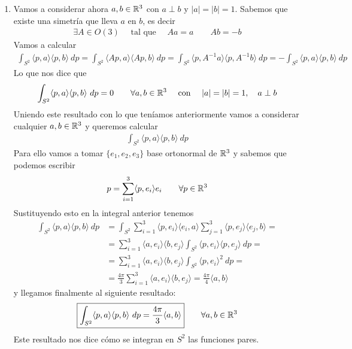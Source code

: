 \begin{ejemplo}
\begin{enumerate}
        \item Vamos a considerar ahora $a,b\in \mathbb{R}^3$ con $a\perp b$ y $|a|=|b|=1$. Sabemos que existe una simetría que lleva $a$ en $b$, es decir
        \begin{gather*}
            \exists A \in O(3) \quad \text{ tal que } \quad Aa=a \qquad Ab=-b
        \end{gather*}
        Vamos a calcular
        \begin{gather*}
            \int_{S^2} \langle p,a \rangle \langle p,b\rangle\ dp = 
            \int_{S^2} \langle Ap, a \rangle \langle Ap, b \rangle\ dp =
            \int_{S^2} \langle p, A^{-1}a \rangle \langle p,A^{-1}b \rangle\ dp = 
            -\int_{S^2} \langle p, a \rangle \langle p, b \rangle\ dp
        \end{gather*}
        Lo que nos dice que 
        \begin{gather*}
            \int_{S^2} \langle p,a \rangle \langle p,b\rangle\ dp = 0 \qquad \forall a,b\in \mathbb{R}^3 \quad \text{ con } \quad |a|=|b|=1,\quad a\perp b
        \end{gather*}
        Uniendo este resultado con lo que teníamos anteriormente vamos a considerar cualquier $a,b\in \mathbb{R}^3$ y queremos calcular
        \begin{gather*}
            \int_{S^2} \langle p,a \rangle \langle p,b \rangle \ dp
        \end{gather*}
        Para ello vamos a tomar $\{e_1, e_2, e_3\}$ base ortonormal de $\mathbb{R}^3$ y sabemos que podemos escribir
        \begin{gather*}
            p = \sum_{i=1}^3\langle p, e_i\rangle e_i \qquad \forall p \in \mathbb{R}^3
        \end{gather*}
        Sustituyendo esto en la integral anterior tenemos
        \begin{align*}
            \int_{S^2} \langle p,a \rangle \langle p,b \rangle \ dp &=
            \int_{S^2} \sum_{i=1}^3\langle p, e_i\rangle \langle e_i, a \rangle \sum_{j=1}^3\langle p, e_j\rangle \langle e_j, b \rangle = \\
            &=
            \sum_{i=1}^3 \langle a, e_i \rangle \langle b, e_j \rangle \int_{S^2} \langle p, e_i \rangle \langle p, e_j \rangle\ dp = \\
            &=
            \sum_{i=1}^3 \langle a, e_i \rangle \langle b, e_j \rangle \int_{S^2} \langle p, e_i \rangle^2\ dp = \\
            &=
            \frac{4\pi}{3} \sum_{i=1}^3 \langle a, e_i \rangle \langle b, e_j \rangle = \frac{4\pi}{4} \langle a,b \rangle
        \end{align*}
        y llegamos finalmente al siguiente resultado:
        \begin{gather*}
            \boxed{\int_{S^2} \langle p,a \rangle \langle p,b \rangle\ dp = \frac{4\pi}{3} \langle a, b \rangle} \qquad \forall a,b\in \bb{R}^3
        \end{gather*}
        Este resultado nos dice cómo se integran en $S^2$ las funciones pares.


\end{enumerate}
\end{ejemplo}
